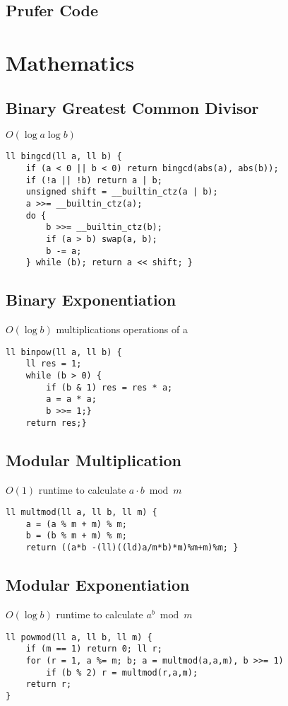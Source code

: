 \documentclass[10pt]{article}{\twocolumn}
\begin{document}
\subsection{Prufer Code}


\section{Mathematics}

\subsection{Binary Greatest Common Divisor}
$O(\log a\log b)$
\begin{lstlisting}
ll bingcd(ll a, ll b) {
    if (a < 0 || b < 0) return bingcd(abs(a), abs(b));
    if (!a || !b) return a | b;
    unsigned shift = __builtin_ctz(a | b);
    a >>= __builtin_ctz(a);
    do {
        b >>= __builtin_ctz(b);
        if (a > b) swap(a, b);
        b -= a;
    } while (b); return a << shift; } \end{lstlisting} 
\subsection{Binary Exponentiation}
$O(\log b)$ multiplications operations of a
\begin{lstlisting}
ll binpow(ll a, ll b) {
    ll res = 1;
    while (b > 0) {
        if (b & 1) res = res * a;
        a = a * a;
        b >>= 1;}
    return res;}
\end{lstlisting}

\subsection{Modular Multiplication}
$O(1)$ runtime to calculate $a \cdot b \bmod m$
\begin{lstlisting}
ll multmod(ll a, ll b, ll m) {
    a = (a % m + m) % m;
    b = (b % m + m) % m;
    return ((a*b -(ll)((ld)a/m*b)*m)%m+m)%m; }
\end{lstlisting}

\subsection{Modular Exponentiation}
$O(\log b)$ runtime to calculate $a ^ b \bmod m$
\begin{lstlisting}
ll powmod(ll a, ll b, ll m) {
    if (m == 1) return 0; ll r;
    for (r = 1, a %= m; b; a = multmod(a,a,m), b >>= 1) 
        if (b % 2) r = multmod(r,a,m);
    return r;
}
\end{lstlisting}
\end{document}
